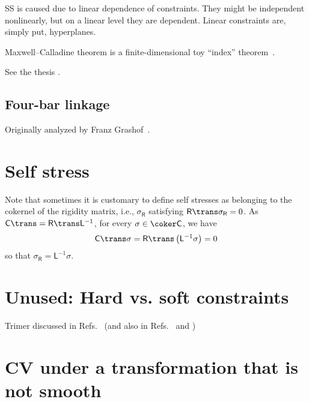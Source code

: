 SS is caused due to linear dependence of constraints.
They might be independent nonlinearly, but on a linear level they are dependent.
Linear constraints are, simply put, hyperplanes.

Maxwell--Calladine theorem is a finite-dimensional toy ``index'' theorem~\cite[\S 2.2]{nakahara2003}.

See the thesis \cite{lengyel2002}.

\subsection{Four-bar linkage}

Originally analyzed by Franz Grashof~\cite[pp.~113--118]{grashof1883}.

\section{Self stress}

Note that sometimes it is customary to define self stresses as belonging to the cokernel of the rigidity matrix, i.e., $\sigma_{\mathsf{R}}$ satisfying $\mathsf{R}\trans\sigma_{\mathsf{R}} = 0$.
As $\mathsf{C}\trans = \mathsf{R}\trans\mathsf{L}^{-1}$, for every $\sigma \in \coker\mathsf{C}$, we have
%
\begin{equation}
  \mathsf{C}\trans\sigma = \mathsf{R}\trans\left(\mathsf{L}^{-1}\mathsf{\sigma}\right) = 0
\end{equation}
%
so that $\sigma_{\mathsf{R}} = \mathsf{L}^{-1}\sigma$.




\section{Unused: Hard vs. soft constraints}

Trimer discussed in Refs.~\cite{kampen1981,kampen1984} (and also in Refs.~\cite[Section 15.1]{frenkel2001} and \cite{walter2011})

\section{CV under a transformation that is not smooth}

